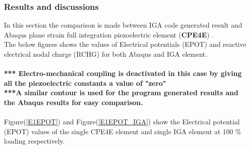 \documentclass[11pt]{article}
\begin{document}
\subsubsection{Results and discussions}
In this section the comparison is made between IGA code generated result and Abaqus plane strain full integration piezoelectric element (\textbf{CPE4E}) \cite{abaqus10version}.\\The below figures shows the values of Electrical potentials (EPOT) and reactive electrical nodal charge (RCHG) for both Abaqus and IGA element.\\
\\\textbf{*** Electro-mechanical coupling is deactivated in this case by giving all the piezoelectric constants a value of "zero"  }
\\
\textbf{***A similar contour is used for the program generated results and the Abaqus results for easy comparison. }\\
\\
Figure(\ref{E1EPOT}) and Figure(\ref{E1EPOT_IGA}) show the Electrical potential (EPOT) values of the single CPE4E element and single IGA element at 100 \% loading respectively. \\
\end{document}
